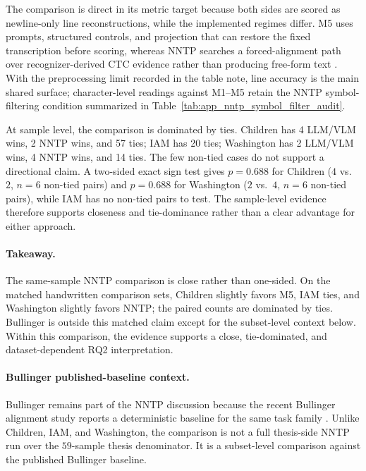 The comparison is direct in its metric target because both sides are scored as newline-only line reconstructions, while the implemented regimes differ. M5 uses prompts, structured controls, and projection that can restore the fixed transcription before scoring, whereas NNTP searches a forced-alignment path over recognizer-derived CTC evidence rather than producing free-form text . With the preprocessing limit recorded in the table note, line accuracy is the main shared surface; character-level readings against M1--M5 retain the NNTP symbol-filtering condition summarized in Table~\ref{tab:app_nntp_symbol_filter_audit}.

At sample level, the comparison is dominated by ties. Children has 4 LLM/VLM wins, 2 NNTP wins, and 57 ties; IAM has 20 ties; Washington has 2 LLM/VLM wins, 4 NNTP wins, and 14 ties. The few non-tied cases do not support a directional claim. A two-sided exact sign test gives \(p = 0.688\) for Children (\(4\) vs.\ \(2\), \(n=6\) non-tied pairs) and \(p = 0.688\) for Washington (\(2\) vs.\ \(4\), \(n=6\) non-tied pairs), while IAM has no non-tied pairs to test. The sample-level evidence therefore supports closeness and tie-dominance rather than a clear advantage for either approach.

\paragraph{Takeaway.}
The same-sample NNTP comparison is close rather than one-sided. On the matched handwritten comparison sets, Children slightly favors M5, IAM ties, and Washington slightly favors NNTP; the paired counts are dominated by ties. Bullinger is outside this matched claim except for the subset-level context below. Within this comparison, the evidence supports a close, tie-dominated, and dataset-dependent RQ2 interpretation.

\FloatBarrier

\paragraph{Bullinger published-baseline context.}
\label{sec:experimentation_bullinger_contextual}

Bullinger remains part of the NNTP discussion because the recent Bullinger alignment study reports a deterministic baseline for the same task family . Unlike Children, IAM, and Washington, the comparison is not a full thesis-side NNTP run over the \(59\)-sample thesis denominator. It is a subset-level comparison against the published Bullinger baseline.

